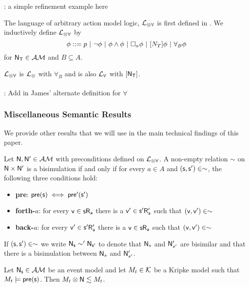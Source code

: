 \FIXME: a simple refinement example here

\begin{defn} \label{arbActLogic}
The language of arbitrary action model logic, $\mathcal{L}_{\otimes\forall}$ is first defined in \cite{hales13synthesis}.
We inductively define $\mathcal{L}_{\otimes\forall}$ by
\[
	\phi ::= p \text{ } | \text{ } \neg \phi \text{ } | \text{ } \phi \land \phi \text{ } | \text{ } \Box_a \phi \text{ } |
  \text{ }[{N_T}] \phi \text{ } | \text{ } \forall_B \phi
\]
for $\mathrm{\mathsf{\mathrm{\mathsf{N}}_T}} \in \mathcal{AM}$ and $B \subseteq A$.
\end{defn}
$\mathcal{L}_{\otimes\forall}$ is $\mathcal{L}_{\otimes}$ with $\forall_B$ and is also $\mathcal{L}_{\forall}$ with $[{\mathrm{\mathsf{N}}_\mathrm{\mathsf{T}}}]$.
\\
\\
\FIXME: Add in James' alternate definition for $\forall$

\subsubsection{Miscellaneous Semantic Results}
We provide other results that we will use in the main technical findings of this paper.

\begin{defn} \label{bisimEvent}
	Let $\mathrm{\mathsf{\mathrm{\mathsf{N}}, \mathrm{\mathsf{N}}'}} \in \mathcal{AM}$ with preconditions defined on $\mathcal{L}_{\otimes\forall}$.
	A non-empty relation $\sim$ on $\mathrm{\mathsf{\mathrm{\mathsf{N}}}} \times \mathrm{\mathsf{\mathrm{\mathsf{N}}'}}$ is a bisimulation if and only if for every $a \in A$
	and $\mathrm{\mathsf{(s, s') \in \sim}}$, the following three conditions hold:
	\begin{itemize}
		\item {\bf pre}: $\mathrm{\mathsf{pre(s)}} \iff \mathrm{\mathsf{pre'(s')}}$
		\item {\bf forth-$a$}: for every $\mathrm{\mathsf{v \in s R_a}}$ there is a $\mathrm{\mathsf{v'
      \in s' R'_a}}$ such that $\mathrm{\mathsf{(v,v')}} \in \sim$
		\item {\bf back-$a$}: for every $\mathrm{\mathsf{v' \in s' R'_a}}$ there is a $\mathrm{\mathsf{v
      \in s R_a}}$ such that $\mathrm{\mathsf{(v,v')}} \in
		\sim$
	\end{itemize}
	If $\mathrm{\mathsf{(s, s') \in \sim}}$ we write $\mathrm{\mathsf{\mathrm{\mathsf{N}}_s \sim '\mathrm{\mathsf{N}}_{s'}}}$ to
  denote that $\mathrm{\mathsf{N}}_s$ and $\mathrm{\mathsf{N}}'_{s'}$ are bisimilar and
	that there is a bisimulation between $\mathrm{\mathsf{N}}_s$ and $\mathrm{\mathsf{N}}'_{s'}$.
\end{defn}

\begin{lemma} \label{eventModelsRefine}
Let $\mathrm{\mathsf{\mathrm{\mathsf{N}}_s}} \in \mathcal{AM}$ be an event model and let $M_t \in \mathcal{K}$ be a Kripke
model such that $M_t \models \mathrm{\mathsf{pre(s)}}$.
Then $M_t \otimes \mathrm{\mathsf{\mathrm{\mathsf{N}}}} \lesssim M_t$.
\end{lemma}

